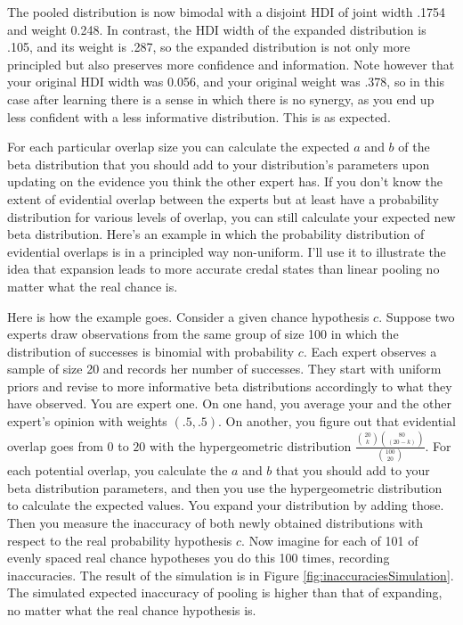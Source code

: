 \documentclass[
  10pt,
  dvipsnames,enabledeprecatedfontcommands]{scrartcl}
\begin{document}
The pooled distribution is now bimodal with a disjoint HDI of joint
width .1754 and weight 0.248. In contrast, the HDI width of the expanded
distribution is .105, and its weight is .287, so the expanded
distribution is not only more principled but also preserves more
confidence and information. Note however that your original HDI width
was 0.056, and your original weight was .378, so in this case after
learning there is a sense in which there is no synergy, as you end up
less confident with a less informative distribution. This is as
expected.

For each particular overlap size you can calculate the expected \(a\)
and \(b\) of the beta distribution that you should add to your
distribution's parameters upon updating on the evidence you think the
other expert has. If you don't know the extent of evidential overlap
between the experts but at least have a probability distribution for
various levels of overlap, you can still calculate your expected new
beta distribution. Here's an example in which the probability
distribution of evidential overlaps is in a principled way non-uniform.
I'll use it to illustrate the idea that expansion leads to more accurate
credal states than linear pooling no matter what the real chance is.

Here is how the example goes. Consider a given chance hypothesis \(c\).
Suppose two experts draw observations from the same group of size 100 in
which the distribution of successes is binomial with probability \(c\).
Each expert observes a sample of size 20 and records her number of
successes. They start with uniform priors and revise to more informative
beta distributions accordingly to what they have observed. You are
expert one. On one hand, you average your and the other expert's opinion
with weights \((.5,.5)\). On another, you figure out that evidential
overlap goes from \(0\) to \(20\) with the hypergeometric distribution
\(\frac{{20 \choose k}{80 \choose (20-k)}}{{100 \choose 20}}\). For each
potential overlap, you calculate the \(a\) and \(b\) that you should add
to your beta distribution parameters, and then you use the
hypergeometric distribution to calculate the expected values. You expand
your distribution by adding those. Then you measure the inaccuracy of
both newly obtained distributions with respect to the real probability
hypothesis \(c\). Now imagine for each of 101 of evenly spaced real
chance hypotheses you do this 100 times, recording inaccuracies. The
result of the simulation is in Figure \ref{fig:inaccuraciesSimulation}.
The simulated expected inaccuracy of pooling is higher than that of
expanding, no matter what the real chance hypothesis is.
\end{document}
